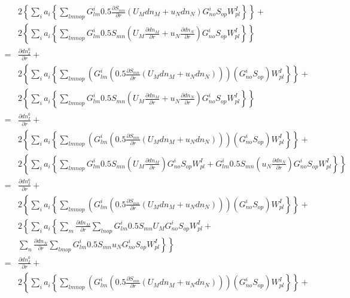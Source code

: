 \documentclass{article}
\begin{document}
\begin{eqnarray*}
&&   2 \left\{ \sum_i a_i \left\{ \sum_{lmnop} G^i_{lm} 0.5 \frac{\partial S_{mn}}{\partial r} (U_M dn_M + u_N dn_N) G^i_{no} S_{op} W^I_{pl} \right\} \right\} + \\
&&   2 \left\{ \sum_i a_i \left\{ \sum_{lmnop} G^i_{lm} 0.5 S_{mn} ( U_M \frac{\partial dn_M}{\partial r} + u_N \frac{\partial dn_N}{\partial r}) G^i_{no} S_{op} W^I_{pl} \right\} \right\} \\
   & = & \frac{\partial dn^0_I}{\partial r} + \\
&&   2 \left\{ \sum_i a_i \left\{ \sum_{lmnop} \left(G^i_{lm} \left( 0.5 \frac{\partial S_{mn}}{\partial r} (U_M dn_M + u_N dn_N)\right)\right) \left( G^i_{no} S_{op} \right) W^I_{pl} \right\} \right\} + \\
&&   2 \left\{ \sum_i a_i \left\{ \sum_{lmnop} G^i_{lm} 0.5 S_{mn} ( U_M \frac{\partial dn_M}{\partial r} + u_N \frac{\partial dn_N}{\partial r}) G^i_{no} S_{op} W^I_{pl} \right\} \right\} \\
   & = & \frac{\partial dn^0_I}{\partial r} + \\
&&   2 \left\{ \sum_i a_i \left\{ \sum_{lmnop} \left(G^i_{lm} \left( 0.5 \frac{\partial S_{mn}}{\partial r} (U_M dn_M + u_N dn_N)\right)\right) \left( G^i_{no} S_{op} \right) W^I_{pl} \right\} \right\} + \\
&&   2 \left\{ \sum_i a_i \left\{ \sum_{lmnop} G^i_{lm} 0.5 S_{mn} ( U_M \frac{\partial dn_M}{\partial r} ) G^i_{no} S_{op} W^I_{pl} + G^i_{lm} 0.5 S_{mn} (u_N \frac{\partial dn_N}{\partial r}) G^i_{no} S_{op} W^I_{pl} \right\} \right\} \\
   & = & \frac{\partial dn^0_I}{\partial r} + \\
&&   2 \left\{ \sum_i a_i \left\{ \sum_{lmnop} \left(G^i_{lm} \left( 0.5 \frac{\partial S_{mn}}{\partial r} (U_M dn_M + u_N dn_N)\right)\right) \left( G^i_{no} S_{op} \right) W^I_{pl} \right\} \right\} + \\
&&   2 \left\{ \sum_i a_i \left\{ \sum_{m} \frac{\partial dn_M}{\partial r} \sum_{lnop} G^i_{lm} 0.5 S_{mn} U_M G^i_{no} S_{op} W^I_{pl} + \right.\right. \\
&&   \left.\left. \sum_{n} \frac{\partial dn_N}{\partial r} \sum_{lmop} G^i_{lm} 0.5 S_{mn} u_N  G^i_{no} S_{op} W^I_{pl} \right\} \right\} \\
   & = & \frac{\partial dn^0_I}{\partial r} + \\
&&   2 \left\{ \sum_i a_i \left\{ \sum_{lmnop} \left(G^i_{lm} \left( 0.5 \frac{\partial S_{mn}}{\partial r} (U_M dn_M + u_N dn_N)\right)\right) \left( G^i_{no} S_{op} \right) W^I_{pl} \right\} \right\} + \\

\end{eqnarray*}
\end{document}
